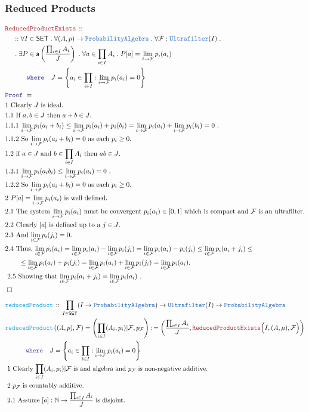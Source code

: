 \documentclass[12pt]{scrartcl}
\newcommand{\TYPE}[1]{\textcolor{NavyBlue}{\mathtt{#1}}}
\newcommand{\FUNC}[1]{\textcolor{Cerulean}{\mathtt{#1}}}
\newcommand{\LOGIC}[1]{\textcolor{Blue}{\mathtt{#1}}}
\newcommand{\THM}[1]{\textcolor{Maroon}{\mathtt{#1}}}
\renewcommand{\.}{\; . \;}
\newcommand{\de}{: \kern 0.1pc =}
\newcommand{\where}{\LOGIC{where}}
\newcommand{\Act}[1]{\left( #1 \right)}
\newcommand{\Theorem}[2]{& \THM{#1} \, :: \, #2 \\ & \Proof = \\ }
\newcommand{\DeclareFunc}[2]{& \FUNC{#1} \, :: \, #2 \\}
\newcommand{\DefineNamedFunc}[4]{&  \FUNC{#1}\Act{#2} = #3 \de #4 \\}
\newcommand{\NewLine}{\\ & \kern 1pc}
\newcommand{\Page}[1]{ \begin{align*} #1 \end{align*}   }
\newcommand{\Nat}{\mathbb{N} }
\newcommand{\QED}{\; \square}
\newcommand{\EndProof}{& \QED \\}
\newcommand{\Proof}{\LOGIC{Proof} \; }
\newcommand{\Explain}[1]{& \text{#1.} \\}
\newcommand{\ExplainFurther}[1]{& \text{#1} \\}
\newcommand{\SET}{\mathsf{SET}}
\newcommand{\F}{\mathcal{F}}
\newcommand{\af}{\mathsf{a}}
\newcommand{\PAlg}{\TYPE{ProbabilityAlgebra}}
\begin{document}
\subsubsection{Reduced Products}
\Page{
	\Theorem{ReducedProductExists}
	{
		\NewLine ::		
		\forall I \in \SET \.
		\forall (A,p) \to \PAlg \.
		\forall \F : \TYPE{Ultrafilter}(I) \. \NewLine \. 
		\exists P \in \af\left( \frac{\prod_{i \in I}A_i}{J} \right) \.  
	 	\forall a \in \prod_{i \in I} A_i \.
	 	P[a] = \lim_{i \to \F} p_i(a_i)  
		\NewLine
		\quad \quad \where \quad  J = \left\{ a_i \in \prod_{i \in I} : \lim_{i \to \F} p_i(a_i)  = 0   \right\}
	}
	\Explain{1 Clearly $J$ is ideal}
	\Explain{1.1 If $a,b \in J$ then $a + b \in J$}
	\Explain{1.1.1 $ \lim_{i \to \F} p_i(a_i +b_i) \le 
		\lim_{i \to \F} p_i(a_i) + p_i(b_i)  = 
		\lim_{i \to \F} p_i(a_i) + \lim_{i \to \F} p_i(b_i) = 0		
		 $  }
	\Explain{1.1.2 So $ \lim_{i \to \F} p_i(a_i +b_i) = 0$ as each $p_i \ge 0$}
	\Explain{1.2 if $a \in J$ and $b \in \prod_{i \in I} A_i$  then $ab \in J$}
	\Explain{1.2.1 $ \lim_{i \to \F} p_i(a_i b_i) \le 
		\lim_{i \to \F} p_i(a_i) = 0		
		 $  }
	\Explain{1.2.2 So $ \lim_{i \to \F} p_i(a_i +b_i) = 0$ as each $p_i \ge 0$}
	\Explain{2 $P[a] = \lim_{i \to \F} p_i(a_i)$ is well defined}
	\Explain{2.1 The system $\lim_{i \to \F} p_i(a_i)$
		must be convergent $p_i(a_i) \in [0,1]$ which is compact and 
		$\F$ is an ultrafilter}
	\Explain{2.2 Clearly $[a]$ is defined up to a $j \in J$}
	\Explain{2.3 And $\lim_{i \in \F} p_i(j_i)  = 0$}
	\ExplainFurther{2.4 Thus, $ 
			\lim_{i \in \F} p_i(a_i) = 			
			\lim_{i \in \F} p_i(a_i) - \lim_{i \in \F} p_i(j_i) =
			\lim_{i \in \F} p_i(a_i) -  p_i(j_i) \le 
			\lim_{i \in \F} p_i(a_i + j_i) \le$}
	\Explain{ $ \quad \quad \le \lim_{i \in \F} p_i(a_i) +  p_i(j_i) =
			\lim_{i \in \F} p_i(a_i) + \lim_{i \in \F} p_i(j_i) =  \lim_{i \in \F} p_i(a_i)  $}
	\Explain{ 2.5 Showing that $\lim_{i \in \F} p_i(a_i + j_i) = \lim_{i \in \F} p_i(a_i) $ }
	\EndProof
}\Page{
	\DeclareFunc{reducedProduct}
	{
		\prod_{I \in \SET} (I \to \PAlg) \to \TYPE{Ultrafilter}(I) \to \PAlg
	}
	\DefineNamedFunc{reducedProduct}{(A,p),\F}{
		\left( \prod_{i\in I} (A_i,p_i)|\F, p_\F \right)}
	{
		\left( \frac{\prod_{i \in I} A_i}{J},
			\THM{ReducedProductExists}\Big( I, (A,\mu), \F \Big) \right) \NewLine \quad \quad \where \quad
		 J = \left\{ a_i \in \prod_{i \in I} : \lim_{i \to \F} p_i(a_i)  = 0   \right\}
	}
	\Explain{ 1 Clearly $ \prod_{i\in I} (A_i,p_i)|\F$ is and algebra and $p_\F$ is non-negative additive}
	\Explain{ 2 $p_\F$ is countably additive}
	\Explain{ 2.1 Assume $[a] : \Nat \to \frac{\prod_{i \in I} A_i}{J}$ is disjoint}
}
\end{document}
